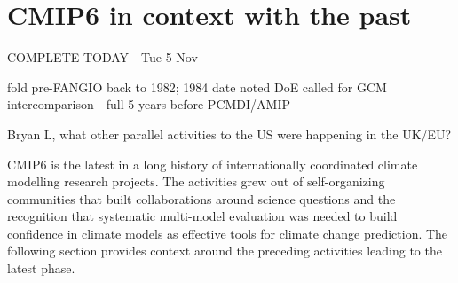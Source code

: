\documentclass[gmd, preprint]{copernicus}
\newcommand{\mycomment}[1]{}
\def\cred#1{{\color{red}#1}}
\def\cblue#1{{\color{blue}#1}}
\begin{document}
\mycomment{
Mention CMIP6 Community MIPs - mentioned in CMIP5 section.
https://docs.google.com/document/d/1Bxu2djLsB0blUUjr4qtwNpZWqMFXkTQRY8kOR_EJvlA/edit?skip_itp2_check=true&pli=1
}


\section{CMIP6 in context with the past}
\label{sec:cmip6InContext}
\cblue{COMPLETE TODAY - Tue 5 Nov}

\cred{fold pre-FANGIO back to 1982; 1984 date noted DoE called for GCM intercomparison - full 5-years before PCMDI/AMIP \citep{ellingson_atmospheric_2016}}

\cred{Bryan L, what other parallel activities to the US were happening in the UK/EU?}

CMIP6 is the latest in a long history of internationally coordinated climate modelling research projects. The activities grew out of self-organizing communities that built collaborations around science questions and the recognition that systematic multi-model evaluation was needed to build confidence in climate models as effective tools for climate change prediction. The following section provides context around the preceding activities leading to the latest phase.


\mycomment{
1955-65: Establishment of Atmospheric General Circulation Modelling
http://pne.people.si.umich.edu/sloan/1955_65.html

Some notes from Curt C for AMIP and CMIP1/2 sections

Line 96: It's misleading to call AMIP runs "atmosphere-only." They also included an interactive land surface. In some cases, it was very simple (e.g., Budyko bucket), but in all cases, it needed to interact with the atmosphere.

Line 104: AMIP stored a time series of monthly means (120 of them for the 10-year AMIP1 period)--not just "climatological annual mean data."

Lines 16-24: Misleading intro to Section 2.2. "In parallel, work continued . . ." implies AOGCMs were developed alongside AMIP. Actually "The first attempts at coupling atmospheric and oceanic models were carried out during the late 1960s and early 1970s (Manabe and Bryan, 1969; Bryan et al., 1975; Manabe et al., 1975)." (IPCC 4AR, Section 1.5.3) Also, saying "climate change cannot be fully simulated without proper considerations of interactions with other major systems such as ocean" is too weak. We must clearly point out that AMIP runs, with SST and sea-ice fixed, cannot simulate future global warming--or past global climate changes in which SSTs are poorly known.

Lines 39 and 54: Were "pdcntrl" and "picntrl" runs really different in practice?

Line 71: Add ". . . for most variables" to ". . . time-averaged quantities were collected."
}
\end{document}
